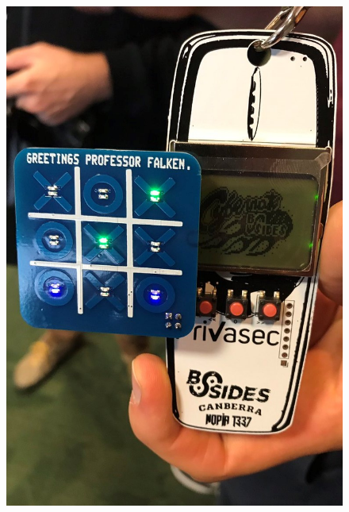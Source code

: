 \documentclass[t]{beamer}
\begin{document}
\begin{frame}
\begin{columns}[c]
	\begin{figure}
		\includegraphics[width=1\linewidth]{joshsao.jpg}
	\end{figure}

\end{columns}

\end{frame}

\end{document}
